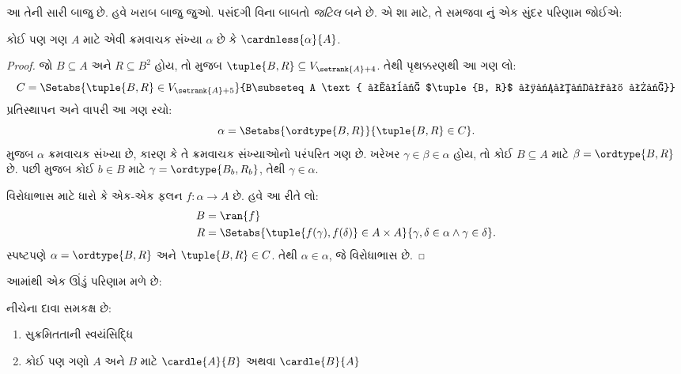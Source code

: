 આ તેની સારી બાજુ છે. હવે ખરાબ બાજુ જુઓ.
પસંદગી વિના બાબતો \emph{જટિલ} બને છે.
એ શા માટે, તે સમજવા \cite{Hartogs1915}નું
એક સુંદર પરિણામ જોઈએ:

\begin{lem}[\emph{$\ZF$માં}]
કોઈ પણ ગણ $A$ માટે એવી ક્રમવાચક સંખ્યા
$\alpha$ છે કે $\cardnless{\alpha}{A}$.
\end{lem}

\begin{proof}
જો $B \subseteq A$ અને $R \subseteq B^2$ હોય,
તો 
મુજબ $\tuple{B, R} \subseteq
V_{\setrank{A}+4}$. તેથી પૃથક્કરણથી આ ગણ લો:
\[
	C = \Setabs{\tuple{B, R} \in V_{\setrank{A}+5}}{B\subseteq A 
	\text{ અને $\tuple{B, R}$ સુક્રમ છે}}
\]
પ્રતિસ્થાપન અને
વાપરી આ ગણ રચો:
\[
	\alpha = \Setabs{\ordtype{B, R}}{\tuple{B, R} \in C}.
\]
 મુજબ
$\alpha$ ક્રમવાચક સંખ્યા છે, કારણ કે તે
ક્રમવાચક સંખ્યાઓનો પરંપરિત ગણ છે.
ખરેખર $\gamma \in \beta \in \alpha$ હોય,
તો કોઈ $B \subseteq A$ માટે
$\beta = \ordtype{B, R}$ છે. પછી
મુજબ કોઈ $b \in B$ માટે
$\gamma = \ordtype{B_b, R_b}$, તેથી
$\gamma \in \alpha$.

વિરોધાભાસ માટે ધારો કે એક-એક ફલન
$f \colon \alpha \to A$ છે. હવે આ રીતે લો:
\begin{align*}
	B &= \ran{f}\\
	R &= \Setabs{\tuple{f(\gamma), f(\delta)} \in A \times A}{\gamma,\delta\in\alpha \land \gamma \in \delta}.
\end{align*}
સ્પષ્ટપણે $\alpha = \ordtype{B, R}$ અને
$\tuple{B, R} \in C$. તેથી $\alpha
\in \alpha$, જે વિરોધાભાસ છે.
\end{proof}

આમાંથી એક ઊંડું પરિણામ મળે છે:

\begin{thm}[\emph{$\ZF$માં}]
નીચેના દાવા સમકક્ષ છે:
\begin{enumerate}
	\item{} સુક્રમિતતાની સ્વયંસિદ્ધિ
	\item{} કોઈ પણ ગણો $A$ અને $B$ માટે
	$\cardle{A}{B}$ અથવા $\cardle{B}{A}$
\end{enumerate}
\end{thm}

